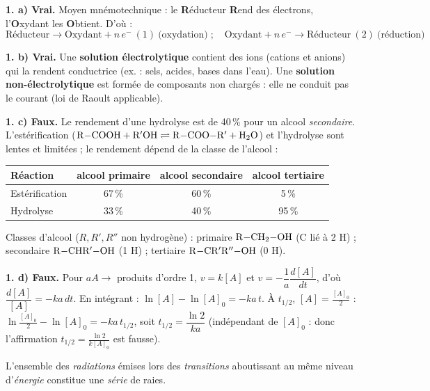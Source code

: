 \documentclass[11pt]{article}
\begin{document}


\textbf{1. a) Vrai.} Moyen mnémotechnique : le \textbf{R}éducteur \textbf{R}end des électrons, l'\textbf{O}xydant les \textbf{O}btient. D'où :
\[ \text{Réducteur} \longrightarrow \text{Oxydant} + n\,e^- \ (1)\ \text{(oxydation)} \;;\quad \text{Oxydant} + n\,e^- \longrightarrow \text{Réducteur} \ (2)\ \text{(réduction)} \]

\textbf{1. b) Vrai.} Une \textbf{solution électrolytique} contient des ions (cations et anions) qui la rendent conductrice (ex. : sels, acides, bases dans l'eau). Une \textbf{solution non-électrolytique} est formée de composants non chargés : elle ne conduit pas le courant (loi de Raoult applicable).

\textbf{1. c) Faux.} Le rendement d'une hydrolyse est de 40\,\% pour un alcool \emph{secondaire}. L'estérification ($\mathrm{R{-}COOH} + \mathrm{R'OH} \rightleftharpoons \mathrm{R{-}COO{-}R'} + \mathrm{H_2O}$) et l'hydrolyse sont lentes et limitées ; le rendement dépend de la classe de l'alcool :
\begin{center}\renewcommand{\arraystretch}{1.4}
\begin{tabular}{|l|c|c|c|}
\hline
Réaction & alcool primaire & alcool secondaire & alcool tertiaire \\
\hline
Estérification & 67\,\% & 60\,\% & 5\,\% \\
\hline
Hydrolyse & 33\,\% & 40\,\% & 95\,\% \\
\hline
\end{tabular}
\end{center}
Classes d'alcool ($R, R', R''$ non hydrogène) : primaire $\mathrm{R{-}CH_2{-}OH}$ (C lié à 2 H) ; secondaire $\mathrm{R{-}CHR'{-}OH}$ (1 H) ; tertiaire $\mathrm{R{-}CR'R''{-}OH}$ (0 H).

\textbf{1. d) Faux.} Pour $aA \longrightarrow$ produits d'ordre 1, $v = k[A]$ et $v = -\dfrac{1}{a}\dfrac{d[A]}{dt}$, d'où $\dfrac{d[A]}{[A]} = -ka\,dt$. En intégrant : $\ln[A] - \ln[A]_0 = -ka\,t$. À $t_{1/2}$, $[A] = \frac{[A]_0}{2}$ : $\ln\frac{[A]_0}{2} - \ln[A]_0 = -ka\,t_{1/2}$, soit $t_{1/2} = \dfrac{\ln 2}{ka}$ (indépendant de $[A]_0$ : donc l'affirmation $t_{1/2} = \frac{\ln 2}{k[A]_0}$ est fausse).

L'ensemble des \emph{radiations} émises lors des \emph{transitions} aboutissant au même niveau d'\emph{énergie} constitue une \emph{série} de raies.
\end{document}
